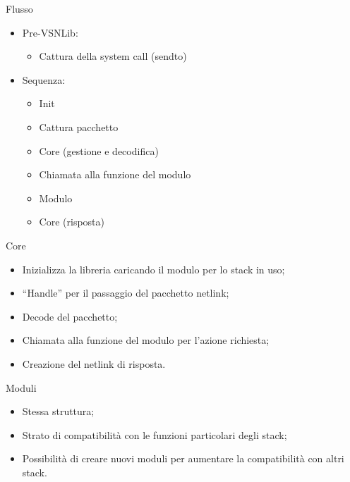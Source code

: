 \documentclass{beamer}
\begin{document}
\begin{frame}[fragile]{Flusso}
 \begin{itemize}
   \setlength\itemsep{2em}
	 \item Pre-VSNLib:
	 \vspace{0.5em}
			\begin{itemize}
			\setlength\itemsep{0.5em}
			\item Cattura della system call (sendto)
			\end{itemize}
     \item Sequenza:
     \vspace{0.5em}
        \begin{itemize}
        \setlength\itemsep{0.5em}
        \item Init
        \item Cattura pacchetto
        \item Core (gestione e decodifica)
        \item Chiamata alla funzione del modulo
				\item Modulo
				\item Core (risposta)
        \end{itemize}

 \end{itemize}
\end{frame}

\begin{frame}[fragile]{Core}
	\begin{itemize}
			\item Inizializza la libreria caricando il modulo per lo stack in uso;\newline
			\item ``Handle'' per il passaggio del pacchetto netlink;\newline
			\item Decode del pacchetto;\newline
			\item Chiamata alla funzione del modulo per l'azione richiesta;\newline
			\item Creazione del netlink di risposta.

	\end{itemize}
\end{frame}

\begin{frame}[fragile]{Moduli}
	\begin{itemize}
      \item Stessa struttura;\newline
      \item Strato di compatibilit\`a con le funzioni particolari degli stack;\newline
      \item Possibilit\`a di creare nuovi moduli per aumentare la compatibilit\`a con altri stack.

  \end{itemize}
\end{frame}
\end{document}
